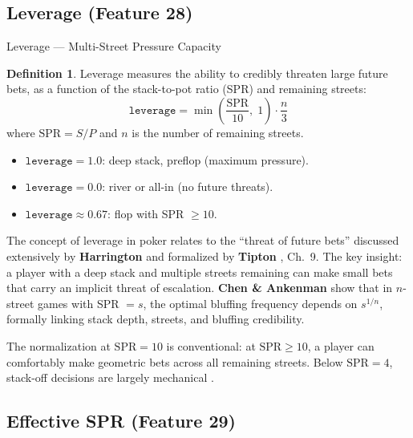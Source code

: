 \documentclass[11pt, a4paper]{article}
\theoremstyle{definition}
\newtheorem{definition}{Definition}[section]
\newcommand{\feature}[1]{\texttt{#1}}
\begin{document}
\subsection{Leverage (Feature 28)}

\begin{featurebox}{Leverage --- Multi-Street Pressure Capacity}
\begin{definition}
Leverage measures the ability to credibly threaten large future bets, as a function of the stack-to-pot ratio (SPR) and remaining streets:
\begin{equation}
    \boxed{\feature{leverage} = \min\!\left(\frac{\text{SPR}}{10},\; 1\right) \cdot \frac{n}{3}}
\end{equation}
where $\text{SPR} = S / P$ and $n$ is the number of remaining streets.

\begin{itemize}
    \item $\feature{leverage} = 1.0$: deep stack, preflop (maximum pressure).
    \item $\feature{leverage} = 0.0$: river or all-in (no future threats).
    \item $\feature{leverage} \approx 0.67$: flop with SPR $\geq 10$.
\end{itemize}
\end{definition}
\end{featurebox}

\begin{refbox}
The concept of leverage in poker relates to the ``threat of future bets'' discussed extensively by \textbf{Harrington} \cite{harrington2004} and formalized by \textbf{Tipton} \cite{tipton2019}, Ch.~9. The key insight: a player with a deep stack and multiple streets remaining can make small bets that carry an implicit threat of escalation. \textbf{Chen \& Ankenman} \cite{chen2006} show that in $n$-street games with SPR $= s$, the optimal bluffing frequency depends on $s^{1/n}$, formally linking stack depth, streets, and bluffing credibility.

The normalization at $\text{SPR} = 10$ is conventional: at $\text{SPR} \geq 10$, a player can comfortably make geometric bets across all remaining streets. Below $\text{SPR} = 4$, stack-off decisions are largely mechanical \cite{harrington2004}.
\end{refbox}

\subsection{Effective SPR (Feature 29)}
\end{document}

